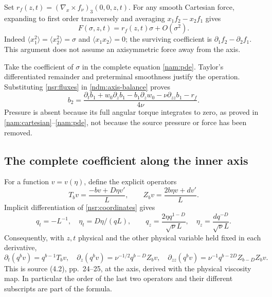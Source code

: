 Set
\(r_f(z,t)=(\nabla_x\times f_\nu)_3(0,0,z,t)\).
For any smooth Cartesian force, expanding to first order transversely
and averaging \(x_1f_2-x_2f_1\) gives
\[
 F(\sigma,z,t)=r_f(z,t)\sigma+O(\sigma^2).
\]
Indeed \(\langle x_1^2\rangle=\langle x_2^2\rangle=\sigma\)
and \(\langle x_1x_2\rangle=0\); the surviving coefficient is
\(\partial_1f_2-\partial_2f_1\). This argument does not assume an
axisymmetric force away from the axis.

Take the coefficient of \(\sigma\) in the complete equation
\eqref{nam:pde}. Taylor's differentiated remainder and preterminal
smoothness justify the operation. Substituting \eqref{nsr:fluxes}
in \eqref{ndm:axis-balance} proves
\begin{equation}\label{nsr:extraction}
 \boxed{\quad
 b_2=\frac{\partial_t b_1+w_0\partial_z b_1
          -b_1\partial_z w_0-\nu\partial_{zz}b_1-r_f}{4\nu}.
 \quad}
\end{equation}
Pressure is absent because its full angular torque integrates to
zero, as proved in \eqref{nam:cartesian}--\eqref{nam:pde}, not
because the source pressure or force has been removed.

\subsection{The complete coefficient along the inner axis}

For a function \(v=v(\eta)\), define the explicit operators
\[
 T_bv=\frac{-bv+D\eta v'}L,\qquad
 Z_bv=\frac{2b\eta v+dv'}L.
\]
Implicit differentiation of \eqref{nsr:coordinates} gives
\[
 q_t=-L^{-1},\quad \eta_t=D\eta/(qL),\qquad
 q_z=\frac{2\eta q^{1-D}}{\sqrt\nu L},\quad
 \eta_z=\frac{d q^{-D}}{\sqrt\nu L}.
\]
Consequently, with \(z,t\) physical and the other physical variable
held fixed in each derivative,
\begin{equation}\label{nsr:operators}
 \partial_t(q^bv)=q^{b-1}T_bv,\quad
 \partial_z(q^bv)=\nu^{-1/2}q^{b-D}Z_bv,\quad
 \partial_{zz}(q^bv)=\nu^{-1}q^{b-2D}Z_{b-D}Z_bv.
\end{equation}
This is source (4.2), pp.~24--25, at the axis, derived with the
physical viscosity map. In particular the order of the last two
operators and their different subscripts are part of the formula.


